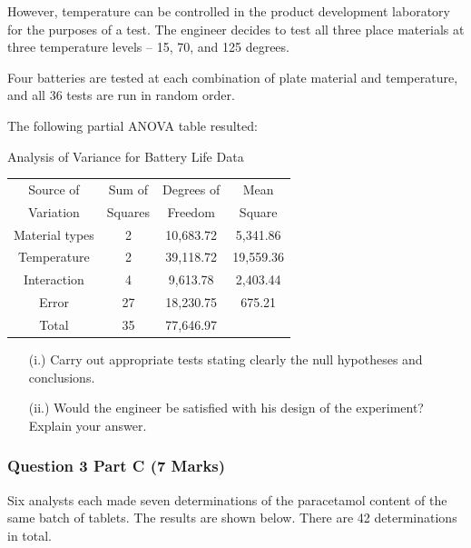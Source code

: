 \documentclass[a4paper,12pt]{article}
\begin{document}
However, temperature can be controlled in the product development laboratory for the purposes of a test.  The engineer decides to test all three place materials at three temperature levels – 15, 70, and 125 degrees. 

Four batteries are tested at each combination of plate material and temperature, and all 36 tests are run in random order.


The following partial ANOVA table resulted:

Analysis of Variance for Battery Life Data
\begin{center}
\begin{tabular}{|c|c|c|c|}\hline
	Source of & Sum of & Degrees of & Mean \\
	
	Variation & Squares & Freedom  & Square\\
	
	Material types & 2&  10,683.72 &  5,341.86 \\
	
	Temperature & 2& 39,118.72 & 19,559.36\\
	
	Interaction & 4& 9,613.78 & 2,403.44\\
	
	Error & 27& 18,230.75 & 675.21\\
	
	Total &35&77,646.97 & \\\hline
\end{tabular} 
\end{center}
\begin{itemize}
\item[(i.)] Carry out appropriate tests stating clearly the null hypotheses and conclusions. 

\item[(ii.)] Would the engineer be satisfied with his design of the experiment? Explain your answer. 
\end{itemize}



\newpage
\subsubsection*{Question 3 Part C (7 Marks)}
Six analysts each made seven determinations of the paracetamol content of the same batch of tablets.
The results are shown below. There are 42 determinations in total. 
\end{document}
